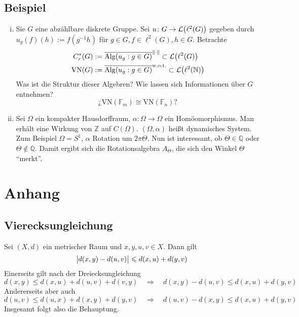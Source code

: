 \subsection{Beispiel} %
\label{sub:102}
\begin{enumerate}[(i)]
	\item Sie $G$ eine abzählbare diskrete Gruppe. Sei $u \colon G \to \mathcal{L}\enbrace*{\ell^2(G)}$ gegeben durch $u_g(f)(h) := f (g ^{-1} h)$ für 
	$g \in G, f \in \ell^2(G), h \in G$. Betrachte 
	\begin{align*}
		C_r^*(G) &:= \overline{\mathrm{Alg}(u_g : g \in G)}^{\norm{\cdot}} \subset \mathcal{L}\enbrace*{\ell^2(G)} \\
		\mathrm{VN}(G) &:= \overline{\mathrm{Alg}(u_g : g \in G)}^{\mathrm{w.o.t.}} \subset \mathcal{L}\enbrace*{\ell^2(\mathds{N})} 
	\end{align*}
	Was ist die Struktur dieser Algebren? Wie lassen sich Informationen über $G$ entnehmen?
	\[
		\text{¿$\mathrm{VN}(\mathds{F}_m) \cong \mathrm{VN}(\mathds{F}_n)$?}
	\]
	\item Sei $\Omega$ ein kompakter Hausdorffraum, $\alpha \colon \Omega \to \Omega$ ein Homöomorphismus. Man erhält eine Wirkung von $\mathds{Z}$ auf $C(\Omega)$.
	$(\Omega,\alpha)$ heißt dynamisches System. Zum Beispiel
	$\Omega =S^1$, $\alpha$ Rotation um $2 \pi \Theta$. Nun ist interessant, ob $\Theta \in \mathds{Q}$ oder $\Theta \not\in \mathds{Q}$. Damit ergibt sich die 
	Rotationsalgebra $A_\Theta$, die sich den Winkel $\Theta$ \enquote{merkt}.
\end{enumerate}

\cleardoubleoddemptypage
\appendix
\section{Anhang} %
\label{sec:anhang}

\subsection{Vierecksungleichung} %
\label{sub:vier_ungl}
Sei $(X,d)$ ein metrischer Raum und $x,y,u,v \in X$. Dann gilt
\[
	\abs[\big]{d(x,y) - d(u,v)} \le d(x,u) + d(y,v) 
\]
Einerseits gilt nach der Dreiecksungleichung
\[
	d(x,y) \le d(x,u) + d(u,v) + d(v,y) \quad \Longrightarrow \quad d(x,y) - d(u,v) \le d(x,u) + d(y,v)
\]
Andererseits aber auch
\[
	d(u,v) \le d(u,x) + d(x,y) + d(y,v) \quad \Longrightarrow \quad d(u,v) - d(x,y) \le d(x,u) + d(y,v)
\]
Insgesamt folgt also die Behauptung. \bewende

